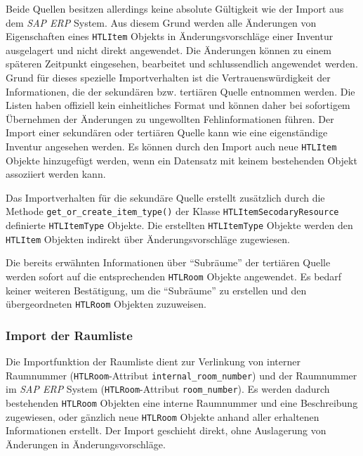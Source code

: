 Beide Quellen besitzen allerdings keine absolute Gültigkeit wie der
Import aus dem \emph{SAP ERP}
System. Aus diesem Grund werden alle Änderungen von Eigenschaften eines
\texttt{HTLItem} Objekts in Änderungsvorschläge einer Inventur
ausgelagert und nicht direkt angewendet. Die Änderungen können zu einem
späteren Zeitpunkt eingesehen, bearbeitet und schlussendlich angewendet
werden. Grund für dieses spezielle Importverhalten ist die
Vertrauenswürdigkeit der Informationen, die der sekundären bzw.
tertiären Quelle entnommen werden. Die Listen haben offiziell kein
einheitliches Format und können daher bei sofortigem Übernehmen der
Änderungen zu ungewollten Fehlinformationen führen. Der Import einer
sekundären oder tertiären Quelle kann wie eine eigenständige Inventur
angesehen werden. Es können durch den Import auch neue \texttt{HTLItem}
Objekte hinzugefügt werden, wenn ein Datensatz mit keinem bestehenden
Objekt assoziiert werden kann.

Das Importverhalten für die sekundäre Quelle erstellt zusätzlich durch
die Methode \texttt{get\_or\_create\_item\_type()} der Klasse
\texttt{HTLItemSecodaryResource} definierte \texttt{HTLItemType}
Objekte. Die erstellten \texttt{HTLItemType} Objekte werden den
\texttt{HTLItem} Objekten indirekt über Änderungsvorschläge zugewiesen.

Die bereits erwähnten Informationen über ``Subräume'' der tertiären
Quelle werden sofort auf die entsprechenden \texttt{HTLRoom} Objekte
angewendet. Es bedarf keiner weiteren Bestätigung, um die ``Subräume''
zu erstellen und den übergeordneten \texttt{HTLRoom} Objekten
zuzuweisen.

\hypertarget{import-der-raumliste}{%
\subsubsection{Import der Raumliste}\label{import-der-raumliste}}

Die Importfunktion der Raumliste dient zur Verlinkung von interner
Raumnummer (\texttt{HTLRoom}-Attribut \texttt{internal\_room\_number})
und der Raumnummer im \emph{SAP ERP}
System (\texttt{HTLRoom}-Attribut \texttt{room\_number}). Es werden
dadurch bestehenden \texttt{HTLRoom} Objekten eine interne Raumnummer
und eine Beschreibung zugewiesen, oder gänzlich neue \texttt{HTLRoom}
Objekte anhand aller erhaltenen Informationen erstellt. Der Import
geschieht direkt, ohne Auslagerung von Änderungen in
Änderungsvorschläge.

